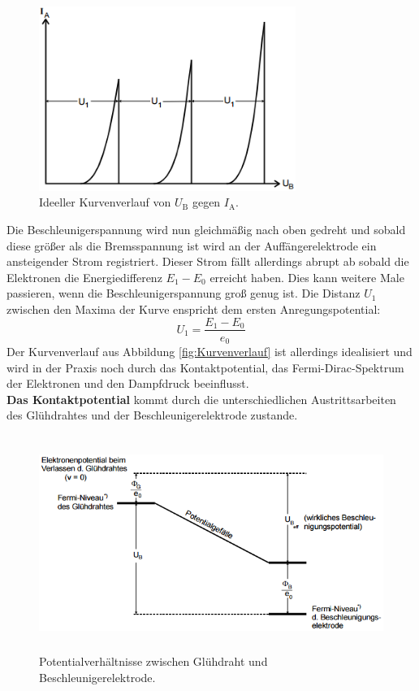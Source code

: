 \begin{figure}[H]
	\centering
	\includegraphics[height=6cm]{picture/Kurvenverlauf}
	\caption{Ideeller Kurvenverlauf von $U_\text{B}$ gegen $I_\text{A}$. \cite[4]{sample}}
	\label{fig:Kurvenverlauf}
\end{figure}

Die Beschleunigerspannung wird nun gleichmäßig nach oben gedreht und sobald diese größer als die Bremsspannung ist wird an der Auffängerelektrode ein ansteigender Strom registriert. Dieser Strom fällt allerdings abrupt ab sobald die Elektronen die Energiedifferenz $E_1 - E_0$ erreicht haben. Dies kann weitere Male passieren, wenn die Beschleunigerspannung groß genug ist. Die Distanz $U_1$ zwischen den Maxima der Kurve enspricht dem ersten Anregungspotential:
\begin{equation}
	U_1 = \frac{E_1 - E_0}{e_0}
\end{equation}
Der Kurvenverlauf aus Abbildung \eqref{fig:Kurvenverlauf} ist allerdings idealisiert und wird in der Praxis noch durch das Kontaktpotential, das Fermi-Dirac-Spektrum der Elektronen und den Dampfdruck beeinflusst. \\
\textbf{Das Kontaktpotential} kommt durch die unterschiedlichen Austrittsarbeiten des Glühdrahtes und der Beschleunigerelektrode zustande.

\begin{figure}[H]
	\centering
	\includegraphics[height=7cm]{picture/Kontakt}
	\caption{Potentialverhältnisse zwischen Glühdraht und Beschleunigerelektrode. \cite[5]{sample}}
	\label{fig:Kontakt}
\end{figure}


